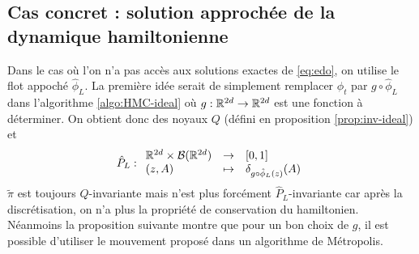 \documentclass[10pt,a4paper]{article}
\begin{document}
\subsection{Cas concret : solution approchée de la dynamique hamiltonienne}
Dans le cas où l'on n'a pas accès aux solutions exactes de \eqref{eq:edo}, on utilise le flot appoché $\hat{\phi}_L$. La première idée serait de simplement remplacer $\phi_t$ par $g \circ \hat{\phi}_L$ dans l'algorithme \ref{algo:HMC-ideal} où $g : \mathbb{R}^{2d} \to \mathbb{R}^{2d}$ est une fonction à déterminer. On obtient donc des noyaux $Q$ (défini en proposition \ref{prop:inv-ideal}) et
$$
\hat{P}_L : { \begin{array}{lcl} 
  \mathbb{R}^{2d} \times \mathcal{B}(\mathbb{R}^{2d}) & \to & [0,1] \\
  (z, A) & \mapsto & \delta_{g \circ \hat{\phi}_L(z)}(A)
 \end{array} }
$$
$\widetilde{\pi}$ est toujours $Q$-invariante mais n'est plus forcément $\hat{P}_L$-invariante car après la discrétisation, on n'a plus la propriété de conservation du hamiltonien. Néanmoins la proposition suivante montre que pour un bon choix de $g$, il est possible d'utiliser le mouvement proposé dans un algorithme de Métropolis.
\end{document}
